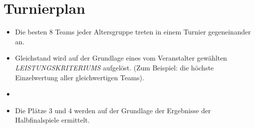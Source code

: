 \documentclass[a4paper,12pt]{article}
\begin{document}
\section{Turnierplan}
\begin{itemize}
	\item Die besten 8 Teams jeder Altersgruppe treten in einem Turnier
		gegeneinander an.
	\item Gleichstand wird auf der Grundlage eines vom Veranstalter
		gewählten \emph{LEISTUNGSKRITERIUMS} aufgelöst. (Zum Beispiel:
		die höchste Einzelwertung aller gleichwertigen Teams).
        \item \tournamentQualification
	\item Die Plätze 3 und 4 werden auf der Grundlage der Ergebnisse der
		Halbfinalspiele ermittelt.
\end{itemize}
\tournamentScoring
\combinedTournament
\end{document}
